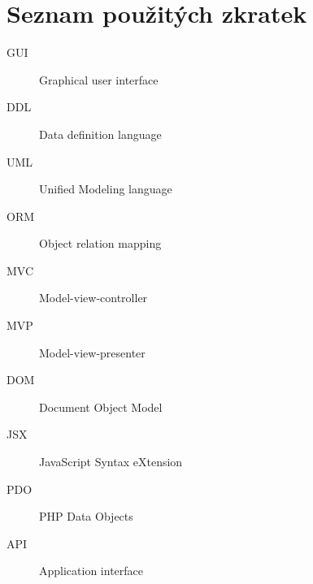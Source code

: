 \documentclass[thesis=B,czech]{FITthesis}[2012/06/26]
\begin{document}
\appendix

\chapter{Seznam použitých zkratek}
\begin{description}
	\item[GUI] Graphical user interface
	\item[DDL] Data definition language
	\item[UML] Unified Modeling language
	\item[ORM] Object relation mapping
	\item[MVC] Model-view-controller
	\item[MVP] Model-view-presenter
	\item[DOM] Document Object Model
	\item[JSX] JavaScript Syntax eXtension
	\item[PDO] PHP Data Objects
	\item[API] Application interface
\end{description}
\end{document}
